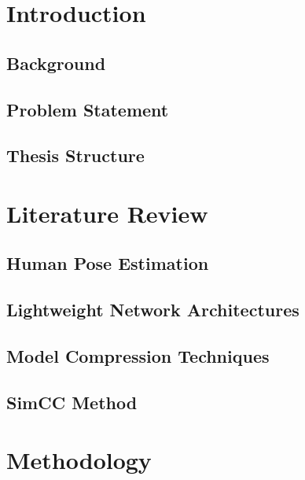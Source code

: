 \documentclass[a4paper,12pt]{article}
\begin{document}
\clearpage
\pagestyle{plain}
\tableofcontents

\clearpage
\pagestyle{main}
\chapter{Introduction}
\section{Background}


\section{Problem Statement}


\section{Thesis Structure}


\chapter{Literature Review}
\section{Human Pose Estimation}

\section{Lightweight Network Architectures}

\section{Model Compression Techniques}

\section{SimCC Method}

\chapter{Methodology}
\end{document}
